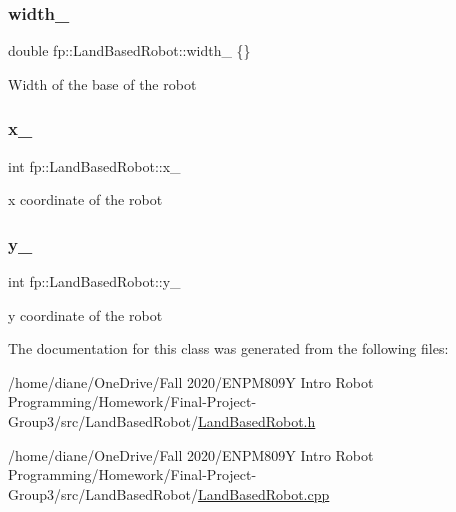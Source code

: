 \mbox{\label{classfp_1_1_land_based_robot_aae605323e9ce63f29dcded204421b1fc}} 
\subsubsection{\texorpdfstring{width\+\_\+}{width\_}}
{\footnotesize\ttfamily double fp\+::\+Land\+Based\+Robot\+::width\+\_\+ \{\}\hspace{0.3cm}{\ttfamily [protected]}}

Width of the base of the robot \mbox{\label{classfp_1_1_land_based_robot_a55c2b5865fd60fb0158a135031f8b271}} 
\subsubsection{\texorpdfstring{x\+\_\+}{x\_}}
{\footnotesize\ttfamily int fp\+::\+Land\+Based\+Robot\+::x\+\_\+\hspace{0.3cm}{\ttfamily [protected]}}

x coordinate of the robot \mbox{\label{classfp_1_1_land_based_robot_a130cfd6ad383116076dc891ee3a52671}} 
\subsubsection{\texorpdfstring{y\+\_\+}{y\_}}
{\footnotesize\ttfamily int fp\+::\+Land\+Based\+Robot\+::y\+\_\+\hspace{0.3cm}{\ttfamily [protected]}}

y coordinate of the robot 

The documentation for this class was generated from the following files\+:\begin{DoxyCompactItemize}
\item 
/home/diane/\+One\+Drive/\+Fall 2020/\+E\+N\+P\+M809\+Y Intro Robot Programming/\+Homework/\+Final-\/\+Project-\/\+Group3/src/\+Land\+Based\+Robot/\hyperlink{_land_based_robot_8h}{Land\+Based\+Robot.\+h}\item 
/home/diane/\+One\+Drive/\+Fall 2020/\+E\+N\+P\+M809\+Y Intro Robot Programming/\+Homework/\+Final-\/\+Project-\/\+Group3/src/\+Land\+Based\+Robot/\hyperlink{_land_based_robot_8cpp}{Land\+Based\+Robot.\+cpp}\end{DoxyCompactItemize}
